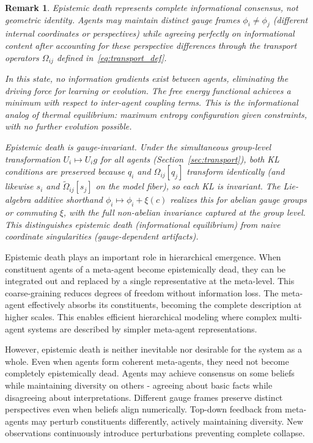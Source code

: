 \documentclass[11pt]{article}
\newtheorem{remark}{Remark}
\begin{document}
\begin{remark}
Epistemic death represents complete informational consensus, not geometric identity. Agents may maintain distinct gauge frames $\phi_i \neq \phi_j$ (different internal coordinates or perspectives) while agreeing perfectly on informational content after accounting for these perspective differences through the transport operators $\Omega_{ij}$ defined in~\eqref{eq:transport_def}.

In this state, no information gradients exist between agents, eliminating the driving force for learning or evolution. The free energy functional achieves a minimum with respect to inter-agent coupling terms. This is the informational analog of thermal equilibrium: maximum entropy configuration given constraints, with no further evolution possible.

Epistemic death is gauge-invariant. Under the simultaneous group-level transformation $U_i \mapsto U_i g$ for all agents (Section~\ref{sec:transport}), both KL conditions are preserved because $q_i$ and $\Omega_{ij}[q_j]$ transform identically (and likewise $s_i$ and $\tilde{\Omega}_{ij}[s_j]$ on the model fiber), so each KL is invariant. The Lie-algebra additive shorthand $\phi_i \mapsto \phi_i + \xi(c)$ realizes this for abelian gauge groups or commuting $\xi$, with the full non-abelian invariance captured at the group level. This distinguishes epistemic death (informational equilibrium) from naive coordinate singularities (gauge-dependent artifacts).
\end{remark}

Epistemic death plays an important role in hierarchical emergence. When constituent agents of a meta-agent become epistemically dead, they can be integrated out and replaced by a single representative at the meta-level. This coarse-graining reduces degrees of freedom without information loss. The meta-agent effectively absorbs its constituents, becoming the complete description at higher scales. This enables efficient hierarchical modeling where complex multi-agent systems are described by simpler meta-agent representations.

However, epistemic death is neither inevitable nor desirable for the system as a whole. Even when agents form coherent meta-agents, they need not become completely epistemically dead. Agents may achieve consensus on some beliefs while maintaining diversity on others - agreeing about basic facts while disagreeing about interpretations. Different gauge frames preserve distinct perspectives even when beliefs align numerically. Top-down feedback from meta-agents may perturb constituents differently, actively maintaining diversity. New observations continuously introduce perturbations preventing complete collapse.
\end{document}
